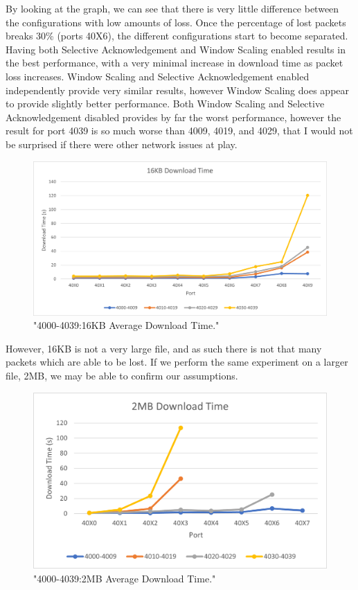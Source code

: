\documentclass[12pt]{article}
\begin{document}
By looking at the graph, we can see that there is very little difference between the configurations with low amounts of loss.
Once the percentage of lost packets breaks 30\% (ports 40X6), the different configurations start to become separated.
Having both Selective Acknowledgement and Window Scaling enabled results in the best performance, with a very minimal increase in download time as packet loss increases.
Window Scaling and Selective Acknowledgement enabled independently provide very similar results, however Window Scaling does appear to provide slightly better performance.
Both Window Scaling and Selective Acknowledgement disabled provides by far the worst performance, however the result for port 4039 is so much worse than 4009, 4019, and 4029, that I would not be surprised if there were other network issues at play.

\begin{figure}[!htbp]
  \centering
  \includegraphics[width=\linewidth]{4000-4039-16KB-download-time.png}
  \caption{"4000-4039:16KB Average Download Time."}
  \label{figure13: 4000-4039:16KB Average Download Time}
\end{figure}

However, 16KB is not a very large file, and as such there is not that many packets which are able to be lost.
If we perform the same experiment on a larger file, 2MB, we may be able to confirm our assumptions.

\begin{figure}[!htbp]
  \centering
  \includegraphics[width=\linewidth]{4000-4039-2MB-download-time.png}
  \caption{"4000-4039:2MB Average Download Time."}
  \label{figure14: 4000-4039:2MB Average Download Time}
\end{figure}
\end{document}
